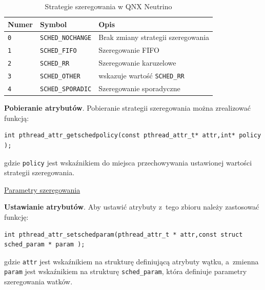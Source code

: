 \begin{table}[h!]
\centering
\caption{Strategie szeregowania w QNX Neutrino}
\setlength{\arrayrulewidth}{1pt}
\setlength{\tabcolsep}{6pt}
\renewcommand{\arraystretch}{1.2}
\begin{tabular}{ |p{}|p{}|p{}| }
\hline \rowcolor{gray}
\textbf{Numer} & \textbf{Symbol} & \textbf{Opis} \\ \hline
\mbox{\lstinline[style=MyCStyle]{0}} & \mbox{\lstinline[style=MyCStyle]{SCHED_NOCHANGE}} & Brak zmiany strategii szeregowania \\ \hline
\mbox{\lstinline[style=MyCStyle]{1}} & \mbox{\lstinline[style=MyCStyle]{SCHED_FIFO}} & Szeregowanie FIFO \\ \hline
\mbox{\lstinline[style=MyCStyle]{2}} & \mbox{\lstinline[style=MyCStyle]{SCHED_RR}} & Szeregowanie karuzelowe \\ \hline
\mbox{\lstinline[style=MyCStyle]{3}} & \mbox{\lstinline[style=MyCStyle]{SCHED_OTHER}} & wskazuje wartość \mbox{\lstinline[style=MyCStyle]{SCHED_RR}} \\ \hline
\mbox{\lstinline[style=MyCStyle]{4}} & \mbox{\lstinline[style=MyCStyle]{SCHED_SPORADIC}} & Szeregowanie sporadyczne \\ \hline
\end{tabular}
\label{tab:sched}
\end{table}

\noindent\textbf{Pobieranie atrybutów}. Pobieranie strategii szeregowania można zrealizować funkcją:

\begin{lstlisting}[style=MyCStyle]
int pthread_attr_getschedpolicy(const pthread_attr_t* attr,int* policy );
\end{lstlisting}

gdzie \lstinline[style=MyCStyle]{policy} jest wskaźnikiem do miejsca przechowywania ustawionej wartości strategii szeregowania.

\noindent\underline{Parametry szeregowania}

\noindent\textbf{Ustawianie atrybutów}. Aby ustawić atrybuty z~tego zbioru należy zastosować funkcję:

\begin{lstlisting}[style=MyCStyle]
int pthread_attr_setschedparam(pthread_attr_t * attr,const struct sched_param * param );
\end{lstlisting}

gdzie \lstinline[style=MyCStyle]{attr} jest wskaźnikiem na strukturę definiującą atrybuty wątku, a~zmienna \lstinline[style=MyCStyle]{param} jest wskaźnikiem na strukturę \lstinline[style=MyCStyle]{sched_param}, która definiuje parametry szeregowania watków.


